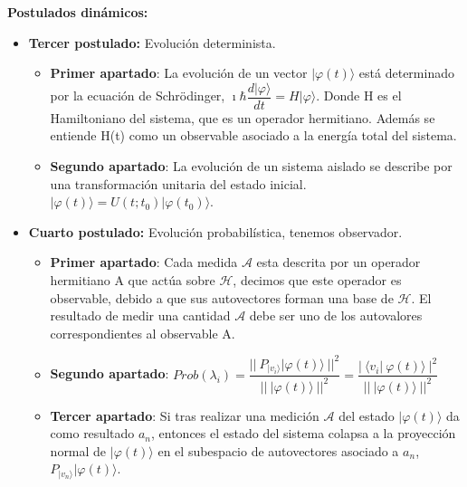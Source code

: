 \textbf{Postulados dinámicos:}
\begin{itemize}
    \item \textbf{Tercer postulado:} Evolución determinista.
        \begin{itemize}
            \item \textbf{Primer apartado}: La evolución de un vector $| \varphi (t) \rangle$ está determinado por la ecuación de Schrödinger, $\imath \hbar \dfrac{d|\varphi\rangle}{dt}=H |\varphi\rangle$. Donde H es el Hamiltoniano del sistema, que es un operador hermitiano. Además se entiende H(t) como un observable asociado a la energía total del sistema.
            \item \textbf{Segundo apartado}: La evolución de un sistema aislado se describe por una transformación unitaria del estado inicial. $| \varphi (t) \rangle = U(t;t_{0})  | \varphi (t_{0}) \rangle$.
        \end{itemize}
    
    \vspace{5pt}
    \newpage
    \item \textbf{Cuarto postulado:} Evolución probabilística, tenemos observador.
    \begin{itemize}
        \item \textbf{Primer apartado}: Cada medida $\mathscr{A}$ esta descrita por un operador hermitiano A que actúa sobre $\mathscr{H}$, decimos que este operador es observable, debido a que sus autovectores forman una base de $\mathscr{H}$. El resultado de medir una cantidad $\mathscr{A}$ debe ser uno de los autovalores correspondientes al observable A.
        \vspace{10pt}
        \item \textbf{Segundo apartado}: $Prob(\lambda_{i}) =  \dfrac{||\:P_{|v_{i}\rangle} | \varphi (t) \rangle\:||^{2}}{||\:| \varphi (t) \rangle\:||^{2}} = \dfrac{|\: \langle  v_{i}  |\: \varphi (t)  \rangle\:|^{2}}{||\:| \varphi (t) \rangle\:||^{2}}$
        \vspace{10pt}
        \item \textbf{Tercer apartado}: Si tras realizar una medición $\mathscr{A}$ del estado $|\varphi(t) \rangle$ da como resultado $a_{n}$, entonces el estado del sistema colapsa a la proyección normal de $|\varphi(t) \rangle$ en el subespacio de autovectores asociado a $a_{n}$,  $P_{|v_{n} \rangle} | \varphi (t) \rangle$.
    \end{itemize}
\end{itemize}

